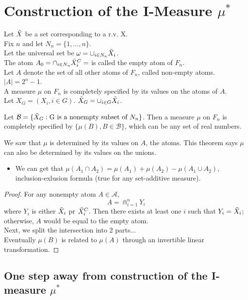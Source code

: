 \documentclass[../main.tex]{subfiles}
\begin{document}
\section*{Construction of the I-Measure $\mu^*$}
Let $\Tilde{X}$ be a set corresponding to a r.v. X.\\
Fix $n$ and let $N_n = \{1,\dots,n\}$.\\
Let the universal set be $\omega=\cup_{i\in N_n}\Tilde{X}_i$. \\
The atom $A_0=\cap_{i\in N_n}\Tilde{X}_i^C=\empty$ is called the empty atom of $F_n$.\\
Let $A$ denote the set of all other atoms of $F_n$, called non-empty atoms. $|A|=2^n-1$.\\
A measure $\mu$ on $F_n$ is completely specified by its values on the atoms of $A$.\\
Let $X_G=(X_i,i\in G)$. $\Tilde{X}_G=\cup_{i\in G} \Tilde{X_i}$.
\begin{bbox}{3.6}
    Let $\mathcal{B}=\{\Tilde{X}_G:\text{G is a nonempty subset of $N_n$}\}$. Then a measure $\mu$ on $F_n$ is completely specified by $\{\mu(B),B\in\mathcal{B}\}$, which can be any set of real numbers.
    \begin{remark}
        We saw that $\mu$ is determined by its values on $A$, the atoms. This theorem says $\mu$ can also be determined by its values on the unions.
    \end{remark}
    \begin{itemize}
        \item We can get that $\mu(A_1\cap A_2)=\mu(A_1)+\mu(A_2)-\mu(A_1\cup A_2)$, inclusion-exlusion formula (true for any set-additive measure).
    \end{itemize}
    \begin{proof}
        For any nonempty atom $A\in\mathcal{A}$, \begin{equation*}
            A=\Cap_{i=1}^nY_i
        \end{equation*} where $Y_i$ is either $\Tilde{X}_i$ pr $\Tilde{X}_i^C$. Then there exists at least one $i$ such that $Y_i=\Tilde{X}_i$; otherwise, $A$ would be equal to the empty atom.\\
        Next, we split the intersection into 2 parts...\\
        Eventually $\mu(B)$ is related to $\mu(A)$ through an invertible linear transformation.
    \end{proof}
\end{bbox}

\subsection{One step away from construction of the I-measure \texorpdfstring{$\mu^*$}{mu*}}
\end{document}
